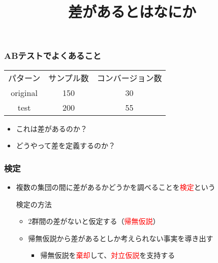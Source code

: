 \documentclass[aspectratio=169]{beamer}
\title{差があるとはなにか}
\begin{document}
    \begin{frame}
        \titlepage
    \end{frame}

    \begin{frame}
        \frametitle{ABテストでよくあること}
        \begin{center}
        \begin{tabular}{ccc}
            \hline
            パターン & サンプル数 & コンバージョン数 \\
            original & 150 & 30 \\
            test & 200 & 55 \\
            \hline
        \end{tabular}
        \end{center}
        \begin{itemize}
            \item これは差があるのか？
            \item どうやって差を定義するのか？
        \end{itemize}
    \end{frame}

    \begin{frame}
        \frametitle{検定}
        \begin{itemize}
            \item 複数の集団の間に差があるかどうかを調べることを\textcolor{red}{検定}という
            \begin{block}{検定の方法}
                \begin{itemize}
                    \item 2群間の差がないと仮定する（\textcolor{red}{帰無仮説}）
                    \item 帰無仮説から差があるとしか考えられない事実を導き出す
                    \begin{itemize}
                        \item 帰無仮説を\textcolor{red}{棄却}して、\textcolor{red}{対立仮説}を支持する
                    \end{itemize}
                \end{itemize}
            \end{block}
        \end{itemize}
    \end{frame}
\end{document}
